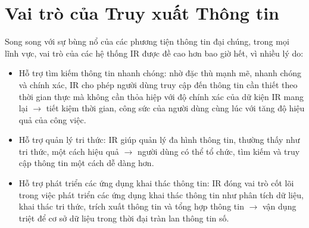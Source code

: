 \section{Vai trò của Truy xuất Thông tin}
Song song với sự bùng nổ của các phương tiện thông tin đại chúng, trong mọi lĩnh vực, vai trò của các hệ thống IR được đề cao hơn bao giờ hết, vì nhiều lý do:
\begin{itemize}
    \item Hỗ trợ tìm kiếm thông tin nhanh chóng: nhờ đặc thù mạnh mẽ, nhanh chóng và chính xác, IR cho phép người dùng truy cập đến thông tin cần thiết theo thời gian thực mà không cần thỏa hiệp với độ chính xác của dữ kiện IR mang lại \(\longrightarrow\) tiết kiệm thời gian, công sức của người dùng cùng lúc với tăng độ hiệu quả của công việc.
    \item Hỗ trợ quản lý tri thức: IR giúp quản lý đa hình thông tin, thường thấy như tri thức, một cách hiệu quả \(\longrightarrow\) người dùng có thể tổ chức, tìm kiếm và truy cập thông tin một cách dễ dàng hơn.
    \item Hỗ trợ phát triển các ứng dụng khai thác thông tin: IR đóng vai trò cốt lõi trong việc phát triển các ứng dụng khai thác thông tin như phân tích dữ liệu, khai thác tri thức, trích xuất thông tin và tổng hợp thông tin \(\longrightarrow\) vận dụng triệt để cơ sở dữ liệu trong thời đại tràn lan thông tin số.
\end{itemize}
